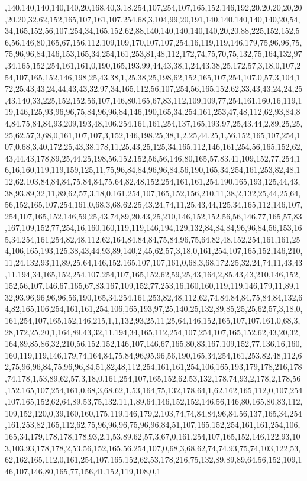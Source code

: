 ,140,140,140,140,140,20,168,40,3,18,254,107,254,107,165,152,146,192,20,20,20,20,20,20,20,32,62,152,165,107,161,107,254,68,3,104,99,20,191,140,140,140,140,140,20,54,34,165,152,56,107,254,34,165,152,62,88,140,140,140,140,140,20,20,88,225,152,152,56,56,146,80,165,67,156,112,109,109,170,107,107,254,16,119,119,146,179,75,96,96,75,75,96,96,84,146,153,165,34,254,161,253,81,48,112,172,74,75,70,75,132,75,164,132,97,34,165,152,254,161,161,0,190,165,193,99,44,43,38,1,24,43,38,25,172,57,3,18,0,107,254,107,165,152,146,198,25,43,38,1,25,38,25,198,62,152,165,107,254,107,0,57,3,104,172,25,43,43,24,44,43,43,32,97,34,165,112,56,107,254,56,165,152,62,33,43,43,24,24,25,43,140,33,225,152,152,56,107,146,80,165,67,83,112,109,109,77,254,161,160,16,119,119,146,125,93,96,96,75,84,96,96,84,146,190,165,34,254,161,253,47,48,112,62,93,84,84,84,75,84,84,93,209,193,48,106,254,161,161,254,137,165,193,97,25,43,44,2,89,25,25,25,62,57,3,68,0,161,107,107,3,152,146,198,25,38,1,2,25,44,25,1,56,152,165,107,254,107,0,68,3,40,172,25,43,38,178,11,25,43,25,125,34,165,112,146,161,254,56,165,152,62,43,44,43,178,89,25,44,25,198,56,152,152,56,56,146,80,165,57,83,41,109,152,77,254,16,16,160,119,119,159,125,11,75,96,84,84,96,96,84,56,190,165,34,254,161,253,82,48,112,62,103,84,84,84,75,84,84,75,64,82,48,152,254,161,161,254,190,165,193,125,44,43,38,93,89,32,11,89,62,57,3,18,0,161,254,107,165,152,156,210,11,38,2,132,25,44,25,64,56,152,165,107,254,161,0,68,3,68,62,25,43,24,74,11,25,43,44,125,34,165,112,146,107,254,107,165,152,146,59,25,43,74,89,20,43,25,210,146,152,152,56,56,146,77,165,57,83,167,109,152,77,254,16,160,160,119,119,146,194,129,132,84,84,84,96,96,84,56,153,165,34,254,161,254,82,48,112,62,164,84,84,84,75,84,96,75,64,82,48,152,254,161,161,254,106,165,193,125,38,43,44,93,89,140,2,45,62,57,3,18,0,161,254,107,165,152,146,210,11,24,132,93,11,89,25,64,146,152,165,107,107,161,0,68,3,68,172,25,32,24,74,11,43,43,11,194,34,165,152,254,107,254,107,165,152,62,59,25,43,164,2,85,43,43,210,146,152,152,56,107,146,67,165,67,83,167,109,152,77,253,16,160,160,119,119,146,179,11,89,132,93,96,96,96,96,56,190,165,34,254,161,253,82,48,112,62,74,84,84,84,75,84,84,132,64,82,165,106,254,161,161,254,106,165,193,97,25,140,25,132,89,85,25,25,62,57,3,18,0,161,254,107,165,152,146,215,1,1,132,93,25,11,25,64,146,152,165,107,107,161,0,68,3,28,172,25,20,1,164,89,43,32,11,194,34,165,112,254,107,254,107,165,152,62,43,20,32,164,89,85,86,32,210,56,152,152,146,107,146,67,165,80,83,167,109,152,77,136,16,160,160,119,119,146,179,74,164,84,75,84,96,95,96,56,190,165,34,254,161,253,82,48,112,62,75,96,96,84,75,96,96,84,51,82,48,112,254,161,161,254,106,165,193,179,178,216,178,74,178,1,53,89,62,57,3,18,0,161,254,107,165,152,62,53,132,178,74,93,2,178,2,178,56,152,165,107,254,161,0,68,3,68,62,1,53,164,75,132,178,64,1,62,162,165,112,0,107,254,107,165,152,62,64,89,53,75,132,11,1,89,64,146,152,152,146,56,146,80,165,80,83,112,109,152,120,0,39,160,160,175,119,146,179,2,103,74,74,84,84,96,84,56,137,165,34,254,161,253,82,165,112,62,75,96,96,96,75,96,96,84,51,107,165,152,254,161,161,254,106,165,34,179,178,178,178,93,2,1,53,89,62,57,3,67,0,161,254,107,165,152,146,122,93,103,103,93,178,178,2,53,56,152,165,56,254,107,0,68,3,68,62,74,74,93,75,74,103,122,53,62,162,165,112,0,161,254,107,165,152,62,53,178,216,75,132,89,89,89,64,56,152,109,146,107,146,80,165,77,156,41,152,119,108,0,1